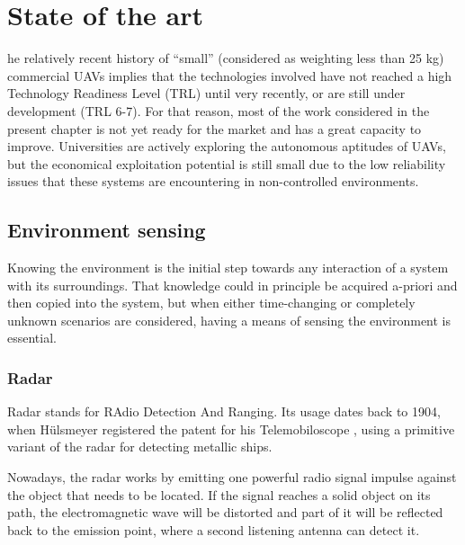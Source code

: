 
\let\textcircled=\pgftextcircled
\chapter{State of the art} \label{chap:sota}

he relatively recent history of ``small'' (considered as weighting less than 25 kg) commercial UAVs implies that the technologies involved have not reached a high Technology Readiness Level (TRL) \cite{assistantsecretaryofdefenseforresearchandengineering2011} until very recently, or are still under development (TRL 6-7).
For that reason, most of the work considered in the present chapter is not yet ready for the market and has a great capacity to improve.
Universities are actively exploring the autonomous aptitudes of UAVs, but the economical exploitation potential is still small due to the low reliability issues that these systems are encountering in non-controlled environments.



\section{Environment sensing} \label{sec:sensing}

Knowing the environment is the initial step towards any interaction of a system with its surroundings.
That knowledge could in principle be acquired a-priori and then copied into the system, but when either time-changing or completely unknown scenarios are considered, having a means of sensing the environment is essential.

\subsection{Radar}

Radar stands for RAdio Detection And Ranging.
Its usage dates back to 1904, when H\"ulsmeyer registered the patent for his Telemobiloscope \cite{hulsmeyer1904}, using a primitive variant of the radar for detecting metallic ships.

Nowadays, the radar works by emitting one powerful radio signal impulse against the object that needs to be located.
If the signal reaches a solid object on its path, the electromagnetic wave will be distorted and part of it will be reflected back to the emission point, where a second listening antenna can detect it.

